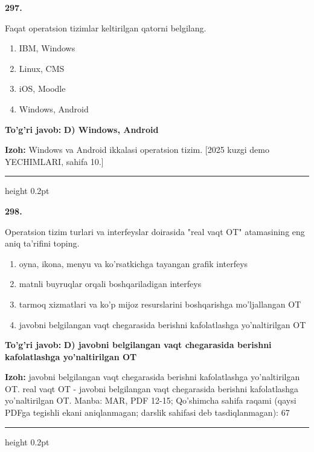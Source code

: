 \documentclass[10pt,a4paper]{article}
\begin{document}
{\bfseries\sffamily\color{ink} 297.}
\par
Faqat operatsion tizimlar keltirilgan qatorni belgilang.
\begin{enumerate}[label=\Alph*),leftmargin=9mm]
\item IBM, Windows
\item Linux, CMS
\item iOS, Moodle
\item Windows, Android
\end{enumerate}
\begin{tcolorbox}[enhanced,breakable,colback=teal!4,colframe=teal!60!black,boxrule=0.45pt,arc=1.2mm,left=2.7mm,right=2.7mm,top=1.8mm,bottom=1.8mm,before skip=2mm,after skip=2mm]
{\bfseries\sffamily\color{teal}To'g'ri javob:} \textbf{D) Windows, Android}
\par\smallskip
{\bfseries Izoh:} Windows va Android ikkalasi operatsion tizim. [2025 kuzgi demo YECHIMLARI, sahifa 10.]
\end{tcolorbox}
\vspace{2mm}\hrule height 0.2pt\vspace{3mm}

{\bfseries\sffamily\color{ink} 298.}
\par
Operatsion tizim turlari va interfeyslar doirasida "real vaqt OT" atamasining eng aniq ta'rifini toping.
\begin{enumerate}[label=\Alph*),leftmargin=9mm]
\item oyna, ikona, menyu va ko'rsatkichga tayangan grafik interfeys
\item matnli buyruqlar orqali boshqariladigan interfeys
\item tarmoq xizmatlari va ko'p mijoz resurslarini boshqarishga mo'ljallangan OT
\item javobni belgilangan vaqt chegarasida berishni kafolatlashga yo'naltirilgan OT
\end{enumerate}
\begin{tcolorbox}[enhanced,breakable,colback=teal!4,colframe=teal!60!black,boxrule=0.45pt,arc=1.2mm,left=2.7mm,right=2.7mm,top=1.8mm,bottom=1.8mm,before skip=2mm,after skip=2mm]
{\bfseries\sffamily\color{teal}To'g'ri javob:} \textbf{D) javobni belgilangan vaqt chegarasida berishni kafolatlashga yo'naltirilgan OT}
\par\smallskip
{\bfseries Izoh:} javobni belgilangan vaqt chegarasida berishni kafolatlashga yo'naltirilgan OT. real vaqt OT - javobni belgilangan vaqt chegarasida berishni kafolatlashga yo'naltirilgan OT. Manba: MAR, PDF 12-15; Qo'shimcha sahifa raqami (qaysi PDFga tegishli ekani aniqlanmagan; darslik sahifasi deb tasdiqlanmagan): 67
\end{tcolorbox}
\vspace{2mm}\hrule height 0.2pt\vspace{3mm}
\end{document}
